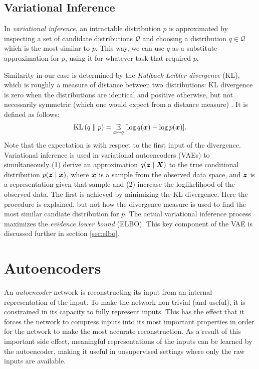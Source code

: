 \subsection{Variational Inference}
\label{sec:variational_inference}
In \textit{variational inference}, an intractable distribution $p$ is approximated by inspecting a set of candidate distributions $\mathcal{Q}$ and choosing a distribution $q \in \mathcal{Q}$ which is the most similar to $p$. This way, we can use $q$ as a substitute approximation for $p$, using it for whatever task that required $p$.

Similarity in our case is determined by the \textit{Kullback-Leibler divergence} (KL), which is roughly a measure of distance between two distributions: KL divergence is zero when the distributions are identical and positive otherwise, but not necessarily symmetric (which one would expect from a distance measure) \cite{standfordVAE}. It is defined as follows:
\[ \operatorname{KL}{\mathopen{} \left(q \parallel p\right) \mathclose{}} =  \operatorname*{\mathbb{E}}_{\bm{ x }\sim q}{\mathopen{} \left[ \log q(\bm{ x }) - \log p(\bm{ x }) \right] \mathclose{}}.\]
Note that the expectation is with respect to the first input of the divergence. Variational inference is used in variational autoencoders (VAEs) to simultaneously (1) derive an approximation $q{\mathopen{} \left( \bm{ z } \mid \bm{ X } \right) \mathclose{}}$ to the true conditional distribution $p{\mathopen{} \left( \bm{ z } \mid \bm{ x } \right) \mathclose{}}$, where $\bm{ x }$ is a sample from the observed data space, and $\bm{ z }$ is a representation given that sample and (2) increase the loglikelihood of the observed data. The first is achieved by minimizing the KL divergence. Here the procedure is explained, but not how the divergence measure is used to find the most similar candiate distribution for $p$. The actual variational inference process maximizes the \textit{evidence lower bound} (ELBO). This key component of the VAE is discussed further in section \ref{sec:elbo}.

\section{Autoencoders}
\label{sec:autoencoders}
An \textit{autoencoder} network is reconstructing its input from an internal representation of the input. To make the network non-trivial (and useful), it is constrained in its capacity to fully represent inputs. This has the effect that it forces the network to compress inputs into its most important properties in order for the network to make the most accurate reconstruction. As a result of this important side effect, meaningful representations of the inputs can be learned by the autoencoder, making it useful in unsupervised settings where only the raw inputs are available.

